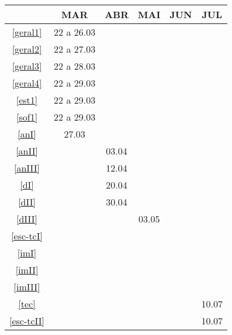 \begin{table}[!htbp]
	\centering
		\begin{tabular}{cccccc}
		\hline
		
		&MAR&ABR&MAI&JUN&JUL\\
		\hline
		\ref{geral1}&\cellcolor{gray}22 a 26.03&&&&\\
		
		\ref{geral2}&\cellcolor{gray}22 a 27.03&&&&\\
		
		\ref{geral3}&\cellcolor{gray}22 a 28.03&&&&\\
		
		\ref{geral4}&\cellcolor{gray}22 a 29.03&&&&\\
		
		\ref{est1}&\cellcolor{gray}22 a 29.03&&&&\\
		
		\ref{sof1}&\cellcolor{gray}22 a 29.03&&&&\\
		
		\ref{anI}&\cellcolor{midgray}27.03&&&&\\
			
		\ref{anII}&&\cellcolor{midgray}03.04&&&\\
					
		\ref{anIII}&&\cellcolor{midgray}12.04&&&\\
			
		\ref{dI}&&\cellcolor{midgray}20.04&&&\\
		
		\ref{dII}&&\cellcolor{midgray}30.04&&&\\
			
		\ref{dIII}&&&\cellcolor{midgray}03.05&&\\
			
		\ref{esc-tcI}&&&\cellcolor{midgray}&&\\
			
		\ref{imI}&&&\cellcolor{midgray}&&\\
			
		\ref{imII}&&&&\cellcolor{midgray}&\\
			
		\ref{imIII}&&&&\cellcolor{midgray}&\\
			
		\ref{tec}&&&&&\cellcolor{midgray}10.07\\
			
		\ref{esc-tcII}&&&&&\cellcolor{midgray}10.07\\
		\hline	
		\end{tabular}
\end{table}

